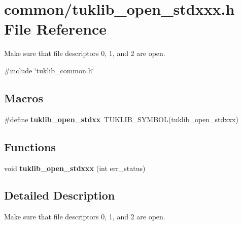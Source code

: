 \section{common/tuklib\+\_\+open\+\_\+stdxxx.h File Reference}
\label{tuklib__open__stdxxx_8h}


Make sure that file descriptors 0, 1, and 2 are open.  


{\ttfamily \#include \char`\"{}tuklib\+\_\+common.\+h\char`\"{}}\newline
\subsection*{Macros}
\begin{DoxyCompactItemize}
\item 
\mbox{\label{tuklib__open__stdxxx_8h_ad0b7dc12c4708d4cc0bca43f9be0beb7}} 
\#define {\bfseries tuklib\+\_\+open\+\_\+stdxx}~T\+U\+K\+L\+I\+B\+\_\+\+S\+Y\+M\+B\+OL(tuklib\+\_\+open\+\_\+stdxxx)
\end{DoxyCompactItemize}
\subsection*{Functions}
\begin{DoxyCompactItemize}
\item 
\mbox{\label{tuklib__open__stdxxx_8h_a8baa8536f3713be6b84596acc12b5b39}} 
void {\bfseries tuklib\+\_\+open\+\_\+stdxxx} (int err\+\_\+status)
\end{DoxyCompactItemize}


\subsection{Detailed Description}
Make sure that file descriptors 0, 1, and 2 are open. 

